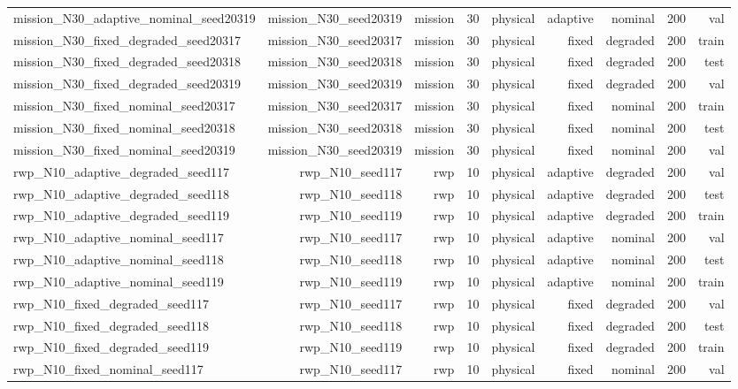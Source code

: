 \begin{tabular}{lrrrrrrrr}
mission\_N30\_adaptive\_nominal\_seed20319 & mission\_N30\_seed20319 & mission & 30 & physical & adaptive & nominal & 200 & val \\
mission\_N30\_fixed\_degraded\_seed20317 & mission\_N30\_seed20317 & mission & 30 & physical & fixed & degraded & 200 & train \\
mission\_N30\_fixed\_degraded\_seed20318 & mission\_N30\_seed20318 & mission & 30 & physical & fixed & degraded & 200 & test \\
mission\_N30\_fixed\_degraded\_seed20319 & mission\_N30\_seed20319 & mission & 30 & physical & fixed & degraded & 200 & val \\
mission\_N30\_fixed\_nominal\_seed20317 & mission\_N30\_seed20317 & mission & 30 & physical & fixed & nominal & 200 & train \\
mission\_N30\_fixed\_nominal\_seed20318 & mission\_N30\_seed20318 & mission & 30 & physical & fixed & nominal & 200 & test \\
mission\_N30\_fixed\_nominal\_seed20319 & mission\_N30\_seed20319 & mission & 30 & physical & fixed & nominal & 200 & val \\
rwp\_N10\_adaptive\_degraded\_seed117 & rwp\_N10\_seed117 & rwp & 10 & physical & adaptive & degraded & 200 & val \\
rwp\_N10\_adaptive\_degraded\_seed118 & rwp\_N10\_seed118 & rwp & 10 & physical & adaptive & degraded & 200 & test \\
rwp\_N10\_adaptive\_degraded\_seed119 & rwp\_N10\_seed119 & rwp & 10 & physical & adaptive & degraded & 200 & train \\
rwp\_N10\_adaptive\_nominal\_seed117 & rwp\_N10\_seed117 & rwp & 10 & physical & adaptive & nominal & 200 & val \\
rwp\_N10\_adaptive\_nominal\_seed118 & rwp\_N10\_seed118 & rwp & 10 & physical & adaptive & nominal & 200 & test \\
rwp\_N10\_adaptive\_nominal\_seed119 & rwp\_N10\_seed119 & rwp & 10 & physical & adaptive & nominal & 200 & train \\
rwp\_N10\_fixed\_degraded\_seed117 & rwp\_N10\_seed117 & rwp & 10 & physical & fixed & degraded & 200 & val \\
rwp\_N10\_fixed\_degraded\_seed118 & rwp\_N10\_seed118 & rwp & 10 & physical & fixed & degraded & 200 & test \\
rwp\_N10\_fixed\_degraded\_seed119 & rwp\_N10\_seed119 & rwp & 10 & physical & fixed & degraded & 200 & train \\
rwp\_N10\_fixed\_nominal\_seed117 & rwp\_N10\_seed117 & rwp & 10 & physical & fixed & nominal & 200 & val \\

\end{tabular}
